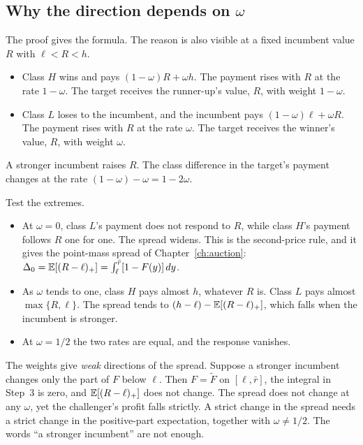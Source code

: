 \subsection{Why the direction depends on \texorpdfstring{\(\omega\)}{omega}}\label{sec:welfare-direction}

The proof gives the formula. The reason is also visible at a fixed incumbent value \(R\) with \(\ell<R<h\).
\begin{itemize}
\item Class \(H\) wins and pays \((1-\omega)R+\omega h\). The payment rises with \(R\) at the rate \(1-\omega\). The
target receives the runner-up's value, \(R\), with weight \(1-\omega\).
\item Class \(L\) loses to the incumbent, and the incumbent pays \((1-\omega)\ell+\omega R\). The payment rises with
\(R\) at the rate \(\omega\). The target receives the winner's value, \(R\), with weight \(\omega\).
\end{itemize}
A stronger incumbent raises \(R\). The class difference in the target's payment changes at the rate
\((1-\omega)-\omega=1-2\omega\).

Test the extremes.
\begin{itemize}
\item At \(\omega=0\), class \(L\)'s payment does not respond to \(R\), while class \(H\)'s payment follows \(R\) one
for one. The spread widens. This is the second-price rule, and it gives the point-mass spread of
Chapter~\ref{ch:auction}: \(\Delta_0=\mathbb{E}[(R-\ell)_+]=\int_\ell^{\bar r}[1-F(y)]\,dy\).
\item As \(\omega\) tends to one, class \(H\) pays almost \(h\), whatever \(R\) is. Class \(L\) pays almost
\(\max\{R,\ell\}\). The spread tends to \((h-\ell)-\mathbb{E}[(R-\ell)_+]\), which falls when the incumbent is stronger.
\item At \(\omega=1/2\) the two rates are equal, and the response vanishes.
\end{itemize}

\begin{watchout}
The weights give \emph{weak} directions of the spread. Suppose a stronger incumbent changes only the part of \(F\) below
\(\ell\). Then \(F=\tilde F\) on \([\ell,\bar r]\), the integral in Step~3 is zero, and \(\mathbb{E}[(R-\ell)_+]\) does not
change. The spread does not change at any \(\omega\), yet the challenger's profit falls strictly. A strict change in
the spread needs a strict change in the positive-part expectation, together with \(\omega\ne1/2\). The words ``a
stronger incumbent'' are not enough.
\end{watchout}


